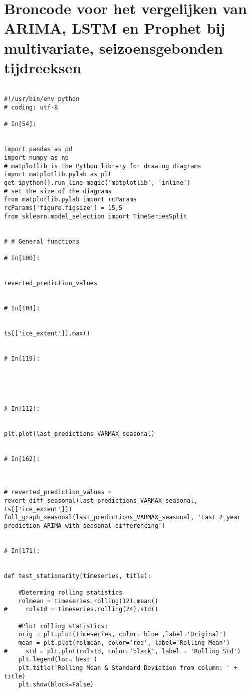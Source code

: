 \section{Broncode voor het vergelijken van ARIMA, LSTM en Prophet bij multivariate, seizoensgebonden tijdreeksen}  %
\begin{verbatim}

#!/usr/bin/env python
# coding: utf-8

# In[54]:


import pandas as pd
import numpy as np
# matplotlib is the Python library for drawing diagrams
import matplotlib.pylab as plt
get_ipython().run_line_magic('matplotlib', 'inline')
# set the size of the diagrams
from matplotlib.pylab import rcParams
rcParams['figure.figsize'] = 15,5
from sklearn.model_selection import TimeSeriesSplit


# # General functions

# In[100]:


reverted_prediction_values


# In[104]:


ts[['ice_extent']].max()


# In[119]:





# In[112]:


plt.plot(last_predictions_VARMAX_seasonal)


# In[162]:



# reverted_prediction_values = revert_diff_seasonal(last_predictions_VARMAX_seasonal, ts[['ice_extent']])
full_graph_seasonal(last_predictions_VARMAX_seasonal, 'Last 2 year prediction ARIMA with seasonal differencing')


# In[171]:


def test_stationarity(timeseries, title):
    
    #Determing rolling statistics
    rolmean = timeseries.rolling(12).mean()
#     rolstd = timeseries.rolling(24).std()

    #Plot rolling statistics:
    orig = plt.plot(timeseries, color='blue',label='Original')
    mean = plt.plot(rolmean, color='red', label='Rolling Mean')
#     std = plt.plot(rolstd, color='black', label = 'Rolling Std')
    plt.legend(loc='best')
    plt.title('Rolling Mean & Standard Deviation from column: ' + title)
    plt.show(block=False)
    

\end{verbatim}
